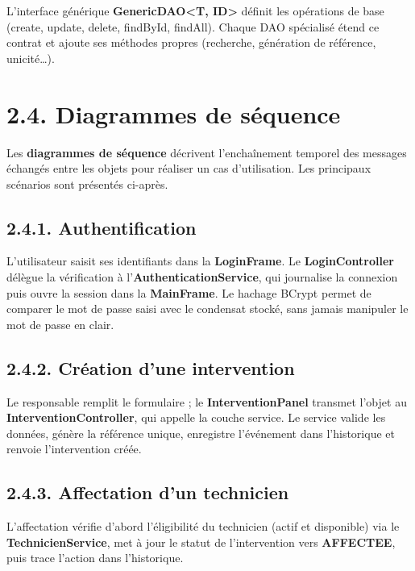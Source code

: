 \documentclass[11pt,a4paper]{report}
\begin{document}
L'interface générique \textbf{GenericDAO<T, ID>} définit les opérations de base (create, update, delete, findById, findAll). Chaque DAO spécialisé étend ce contrat et ajoute ses méthodes propres (recherche, génération de référence, unicité…).
\section*{2.4. Diagrammes de séquence}

Les \textbf{diagrammes de séquence} décrivent l'enchaînement temporel des messages échangés entre les objets pour réaliser un cas d'utilisation. Les principaux scénarios sont présentés ci-après.
\subsection*{2.4.1. Authentification}

L'utilisateur saisit ses identifiants dans la \textbf{LoginFrame}. Le \textbf{LoginController} délègue la vérification à l'\textbf{AuthenticationService}, qui journalise la connexion puis ouvre la session dans la \textbf{MainFrame}. Le hachage BCrypt permet de comparer le mot de passe saisi avec le condensat stocké, sans jamais manipuler le mot de passe en clair.
\subsection*{2.4.2. Création d'une intervention}

Le responsable remplit le formulaire ; le \textbf{InterventionPanel} transmet l'objet au \textbf{InterventionController}, qui appelle la couche service. Le service valide les données, génère la référence unique, enregistre l'événement dans l'historique et renvoie l'intervention créée.
\subsection*{2.4.3. Affectation d'un technicien}

L'affectation vérifie d'abord l'éligibilité du technicien (actif et disponible) via le \textbf{TechnicienService}, met à jour le statut de l'intervention vers \textbf{AFFECTEE}, puis trace l'action dans l'historique.
\end{document}
